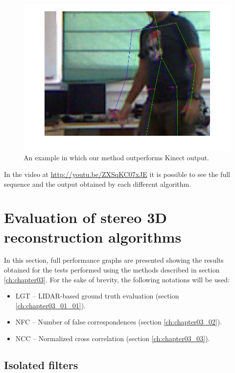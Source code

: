 \begin{figure}[h]
  \centering
  \includegraphics[width=0.5\columnwidth, trim=0 0 0 0,clip]{fig34.jpg}
  \caption{An example in which our method outperforms Kinect output.}
  \label{fig:cp02_comparison_kinect_fails}
\end{figure}

In the video at \url{http://youtu.be/ZXSqKC07xJE} it is possible to see the full sequence and the output obtained by each different algorithm.

\FloatBarrier

\graphicspath{{./images/chapter03/bmps/}{./images/chapter03/vects/}{./images/chapter03/}}
\section{Evaluation of stereo 3D reconstruction algorithms}\label{ch:chapter03_04}

In this section, full performance graphs are presented showing the results obtained for the tests performed using the methods described in section \ref{ch:chapter03}. For the sake of brevity, the following notations will be used:
\begin{itemize}
 \item LGT – LIDAR-based ground truth evaluation (section \ref{ch:chapter03_01_01}).
 \item NFC – Number of false correspondences (section \ref{ch:chapter03_02}).
 \item NCC – Normalized cross correlation (section \ref{ch:chapter03_03}).
\end{itemize}

\subsection{Isolated filters}\label{ch:chapter03_04_01}

